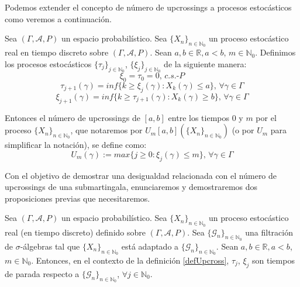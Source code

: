 Podemos extender el concepto de número de upcrossings a procesos estocásticos como veremos a continuación.

\begin{definicion}\label{defUpcross}
Sea $(\Gamma , \mathcal{A}, P)$ un espacio probabilístico. Sea $\{X_n\}_{n\in \mathds{N}_0}$ un proceso estocástico real en tiempo discreto sobre $(\Gamma , \mathcal{A}, P)$. Sean $a,b\in\mathds{R}, a<b$, $m\in\mathds{N}_0$. Definimos los procesos estocásticos $\{\tau _j\}_{j\in \mathds{N}_0}$, $\{\xi _j\}_{j\in \mathds{N}_0}$ de la siguiente manera:
$$\xi _0 = \tau _0 =0 \text{, }c.s.\text{-}P$$
$$ \tau_{j+1}(\gamma) = inf\{k\geq \xi_j(\gamma) : X_k(\gamma)\leq a\} \text{, }\forall \gamma \in \Gamma$$
$$\xi_{j+1}(\gamma) = inf\{k\geq \tau_{j+1}(\gamma) : X_k(\gamma)\geq b\} \text{, }\forall \gamma \in \Gamma$$

Entonces el número de upcrossings de $[a,b]$ entre los tiempos $0$ y $m$ por el proceso $\{X_n\}_{n\in \mathds{N}_0}$, que notaremos por $U_m[a,b](\{X_n\}_{n\in\mathds{N}_0})$ (o por $U_m$ para simplificar la notación), se define como:
$$U_m(\gamma) := max\{j\geq 0 : \xi_j(\gamma) \leq m\}\text{, }\forall \gamma \in \Gamma$$

\end{definicion}

Con el objetivo de demostrar una desigualdad relacionada con el número de upcrossings de una submartingala, enunciaremos y demostraremos dos proposiciones previas que necesitaremos.

\begin{proposicion}\label{upcrossTParada}
Sea $(\Gamma , \mathcal{A}, P)$ un espacio probabilístico. Sea $\{X_n\}_{n\in \mathds{N}_0}$ un proceso estocástico real (en tiempo discreto) definido sobre $(\Gamma, \mathcal{A}, P)$. Sea $\{\mathscr{G}_n\}_{n\in\mathds{N}_0}$ una filtración de $\sigma$-álgebras tal que $\{X_n\}_{n\in \mathds{N}_0}$ está adaptado a $\{\mathscr{G}_n\}_{n\in\mathds{N}_0}$. Sean $a,b\in\mathds{R}, a<b$, $m\in\mathds{N}_0$. Entonces, en el contexto de la definición \ref{defUpcross}, $\tau _j$, $\xi _j$ son tiempos de parada respecto a $\{\mathscr{G}_n\}_{n\in\mathds{N}_0}$, $\forall j\in \mathds{N}_0$.
\end{proposicion}


